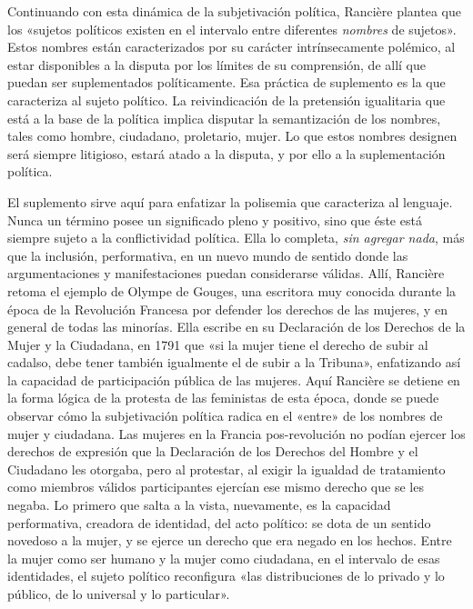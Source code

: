 Continuando con esta dinámica de la subjetivación política, Rancière plantea que los «sujetos políticos existen en el intervalo entre diferentes \emph{nombres} de sujetos». Estos nombres están caracterizados por su carácter intrínsecamente polémico, al estar disponibles a la disputa por los límites de su comprensión, de allí que puedan ser suplementados políticamente. Esa práctica de suplemento es la que caracteriza al sujeto político. La reivindicación de la pretensión igualitaria que está a la base de la política implica disputar la semantización de los nombres, tales como hombre, ciudadano, proletario, mujer. Lo que estos nombres designen será siempre litigioso, estará atado a la disputa, y por ello a la suplementación política.

El suplemento sirve aquí para enfatizar la polisemia que caracteriza al lenguaje. Nunca un término posee un significado pleno y positivo, sino que éste está siempre sujeto a la conflictividad política. Ella lo completa, \emph{sin agregar nada}, más que la inclusión, performativa, en un nuevo mundo de sentido donde las argumentaciones y manifestaciones puedan considerarse válidas. Allí, Rancière retoma el ejemplo de Olympe de Gouges, una escritora muy conocida durante la época de la Revolución Francesa por defender los derechos de las mujeres, y en general de todas las minorías. Ella escribe en su Declaración de los Derechos de la Mujer y la Ciudadana, en 1791 que «si la mujer tiene el derecho de subir al cadalso, debe tener también igualmente el de subir a la Tribuna», enfatizando así la capacidad de participación pública de las mujeres. Aquí Rancière se detiene en la forma lógica de la protesta de las feministas de esta época, donde se puede observar cómo la subjetivación política radica en el «entre» de los nombres de mujer y ciudadana. Las mujeres en la Francia pos-revolución no podían ejercer los derechos de expresión que la Declaración de los Derechos del Hombre y el Ciudadano les otorgaba, pero al protestar, al exigir la igualdad de tratamiento como miembros válidos participantes ejercían ese mismo derecho que se les negaba. Lo primero que salta a la vista, nuevamente, es la capacidad performativa, creadora de identidad, del acto político: se dota de un sentido novedoso a la mujer, y se ejerce un derecho que era negado en los hechos. Entre la mujer como ser humano y la mujer como ciudadana, en el intervalo de esas identidades, el sujeto político reconfigura «las distribuciones de lo privado y lo público, de lo universal y lo particular».

